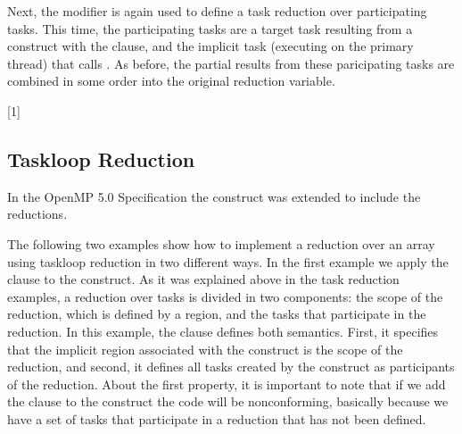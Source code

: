 

Next, the  modifier is again used to define a task reduction over
participating tasks. This time, the participating tasks are a target task
resulting from a  construct with the  clause,
and the implicit task (executing on the primary thread) that calls
. As before, the partial results from these paricipating
tasks are combined in some order into the original reduction variable.


[1]


\subsection{Taskloop Reduction}
\label{subsec:taskloop_reduction}

In the OpenMP 5.0 Specification the  construct
was extended to include the reductions.

The following two examples show how to implement a reduction over an array
using taskloop reduction in two different ways.
In the first
example we apply the  clause to the  construct. As it was
explained above in the task reduction examples, a reduction over tasks is
divided in two components: the scope of the reduction, which is defined by a
 region, and the tasks that participate in the reduction. In this
example, the  clause defines both semantics. First, it specifies that
the implicit  region associated with the  construct is the scope of the
reduction, and second, it defines all tasks created by the  construct as
participants of the reduction. About the first property, it is important to note
that if we add the  clause to the  construct the code will be
nonconforming, basically because we have a set of tasks that participate in a
reduction that has not been defined.


